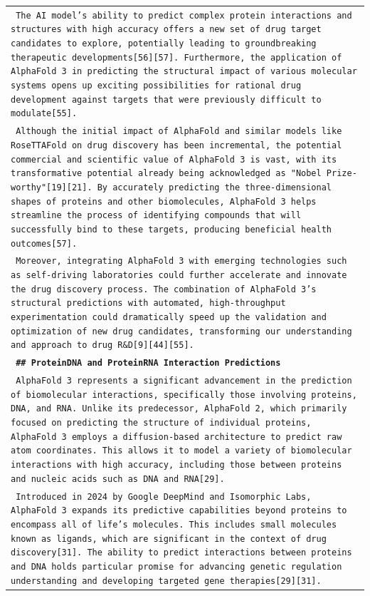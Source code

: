 \begin{longtable}{p{\textwidth}}
\texttt{\small{ The AI model's ability to predict complex protein interactions and structures with high accuracy offers a new set of drug target candidates to explore, potentially leading to groundbreaking therapeutic developments[56][57]. Furthermore, the application of AlphaFold 3 in predicting the structural impact of various molecular systems opens up exciting possibilities for rational drug development against targets that were previously difficult to modulate[55]. }} \\
\texttt{\small{ Although the initial impact of AlphaFold and similar models like RoseTTAFold on drug discovery has been incremental, the potential commercial and scientific value of AlphaFold 3 is vast, with its transformative potential already being acknowledged as "Nobel Prize-worthy"[19][21]. By accurately predicting the three-dimensional shapes of proteins and other biomolecules, AlphaFold 3 helps streamline the process of identifying compounds that will successfully bind to these targets, producing beneficial health outcomes[57]. }} \\
\texttt{\small{ Moreover, integrating AlphaFold 3 with emerging technologies such as self-driving laboratories could further accelerate and innovate the drug discovery process. The combination of AlphaFold 3's structural predictions with automated, high-throughput experimentation could dramatically speed up the validation and optimization of new drug candidates, transforming our understanding and approach to drug R\&D[9][44][55]. }} \\
\vspace{1pt}
\texttt{\small{\textbf{ \#\# ProteinDNA and ProteinRNA Interaction Predictions }}} \\
\texttt{\small{ AlphaFold 3 represents a significant advancement in the prediction of biomolecular interactions, specifically those involving proteins, DNA, and RNA. Unlike its predecessor, AlphaFold 2, which primarily focused on predicting the structure of individual proteins, AlphaFold 3 employs a diffusion-based architecture to predict raw atom coordinates. This allows it to model a variety of biomolecular interactions with high accuracy, including those between proteins and nucleic acids such as DNA and RNA[29]. }} \\
\texttt{\small{ Introduced in 2024 by Google DeepMind and Isomorphic Labs, AlphaFold 3 expands its predictive capabilities beyond proteins to encompass all of life's molecules. This includes small molecules known as ligands, which are significant in the context of drug discovery[31]. The ability to predict interactions between proteins and DNA holds particular promise for advancing genetic regulation understanding and developing targeted gene therapies[29][31]. }} \\

\end{longtable}
